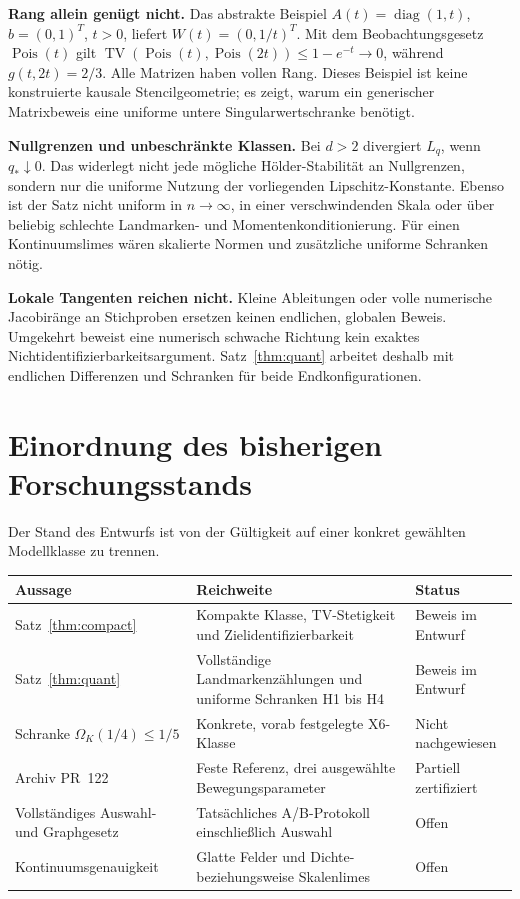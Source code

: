 \documentclass[11pt,a4paper]{article}
\theoremstyle{definition}\newtheorem{definition}{Definition}
\theoremstyle{remark}\newtheorem*{remark}{Bemerkung}
\newcommand{\TV}{\operatorname{TV}}
\newcommand{\Pois}{\operatorname{Pois}}
\newcommand{\diag}{\operatorname{diag}}
\begin{document}
\textbf{Rang allein genügt nicht.} Das abstrakte Beispiel $A(t)=\diag(1,t)$, $b=(0,1)^T$, $t>0$, liefert $W(t)=(0,1/t)^T$. Mit dem Beobachtungsgesetz $\Pois(t)$ gilt $\TV(\Pois(t),\Pois(2t))\leq1-e^{-t}\to0$, während $g(t,2t)=2/3$. Alle Matrizen haben vollen Rang. Dieses Beispiel ist keine konstruierte kausale Stencilgeometrie; es zeigt, warum ein generischer Matrixbeweis eine uniforme untere Singularwertschranke benötigt.

\textbf{Nullgrenzen und unbeschränkte Klassen.} Bei $d>2$ divergiert $L_q$, wenn $q_*\downarrow0$. Das widerlegt nicht jede mögliche Hölder-Stabilität an Nullgrenzen, sondern nur die uniforme Nutzung der vorliegenden Lipschitz-Konstante. Ebenso ist der Satz nicht uniform in $n\to\infty$, in einer verschwindenden Skala oder über beliebig schlechte Landmarken- und Momentenkonditionierung. Für einen Kontinuumslimes wären skalierte Normen und zusätzliche uniforme Schranken nötig.

\textbf{Lokale Tangenten reichen nicht.} Kleine Ableitungen oder volle numerische Jacobiränge an Stichproben ersetzen keinen endlichen, globalen Beweis. Umgekehrt beweist eine numerisch schwache Richtung kein exaktes Nichtidentifizierbarkeitsargument. Satz~\ref{thm:quant} arbeitet deshalb mit endlichen Differenzen und Schranken für beide Endkonfigurationen.

\section{Einordnung des bisherigen Forschungsstands}

Der Stand des Entwurfs ist von der Gültigkeit auf einer konkret gewählten Modellklasse zu trennen.

\begin{center}\small
\begin{tabularx}{\textwidth}{@{}>{\raggedright\arraybackslash}p{}>{\raggedright\arraybackslash}X>{\raggedright\arraybackslash}p{}@{}}
\toprule
Aussage & Reichweite & Status\\
\midrule
Satz~\ref{thm:compact} & Kompakte Klasse, TV-Stetigkeit und Zielidentifizierbarkeit & Beweis im Entwurf\\
Satz~\ref{thm:quant} & Vollständige Landmarkenzählungen und uniforme Schranken H1 bis H4 & Beweis im Entwurf\\
Schranke $\Omega_K(1/4)\leq1/5$ & Konkrete, vorab festgelegte X6-Klasse & Nicht nachgewiesen\\
Archiv PR~122 & Feste Referenz, drei ausgewählte Bewegungsparameter & Partiell zertifiziert\\
Vollständiges Auswahl- und Graphgesetz & Tatsächliches A/B-Protokoll einschließlich Auswahl & Offen\\
Kontinuumsgenauigkeit & Glatte Felder und Dichte- beziehungsweise Skalenlimes & Offen\\
\bottomrule
\end{tabularx}
\end{center}
\end{document}
